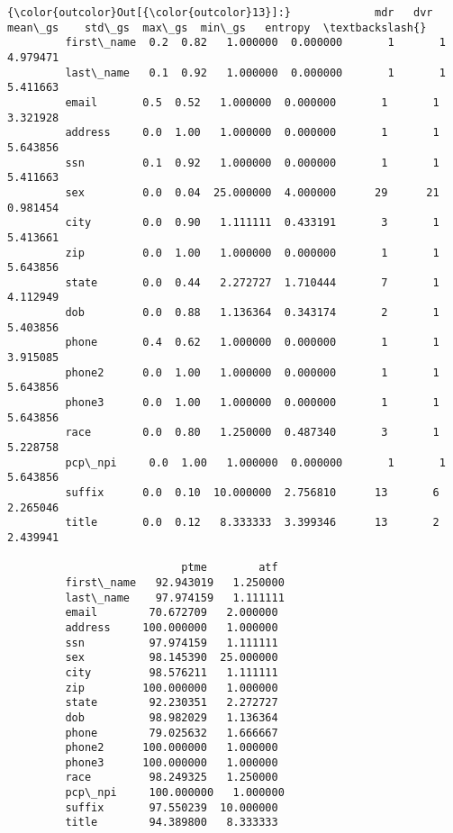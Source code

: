 \documentclass[11pt]{article}
\begin{document}
\begin{Verbatim}[commandchars=\\\{\}]
{\color{outcolor}Out[{\color{outcolor}13}]:}             mdr   dvr    mean\_gs    std\_gs  max\_gs  min\_gs   entropy  \textbackslash{}
         first\_name  0.2  0.82   1.000000  0.000000       1       1  4.979471   
         last\_name   0.1  0.92   1.000000  0.000000       1       1  5.411663   
         email       0.5  0.52   1.000000  0.000000       1       1  3.321928   
         address     0.0  1.00   1.000000  0.000000       1       1  5.643856   
         ssn         0.1  0.92   1.000000  0.000000       1       1  5.411663   
         sex         0.0  0.04  25.000000  4.000000      29      21  0.981454   
         city        0.0  0.90   1.111111  0.433191       3       1  5.413661   
         zip         0.0  1.00   1.000000  0.000000       1       1  5.643856   
         state       0.0  0.44   2.272727  1.710444       7       1  4.112949   
         dob         0.0  0.88   1.136364  0.343174       2       1  5.403856   
         phone       0.4  0.62   1.000000  0.000000       1       1  3.915085   
         phone2      0.0  1.00   1.000000  0.000000       1       1  5.643856   
         phone3      0.0  1.00   1.000000  0.000000       1       1  5.643856   
         race        0.0  0.80   1.250000  0.487340       3       1  5.228758   
         pcp\_npi     0.0  1.00   1.000000  0.000000       1       1  5.643856   
         suffix      0.0  0.10  10.000000  2.756810      13       6  2.265046   
         title       0.0  0.12   8.333333  3.399346      13       2  2.439941   
         
                           ptme        atf  
         first\_name   92.943019   1.250000  
         last\_name    97.974159   1.111111  
         email        70.672709   2.000000  
         address     100.000000   1.000000  
         ssn          97.974159   1.111111  
         sex          98.145390  25.000000  
         city         98.576211   1.111111  
         zip         100.000000   1.000000  
         state        92.230351   2.272727  
         dob          98.982029   1.136364  
         phone        79.025632   1.666667  
         phone2      100.000000   1.000000  
         phone3      100.000000   1.000000  
         race         98.249325   1.250000  
         pcp\_npi     100.000000   1.000000  
         suffix       97.550239  10.000000  
         title        94.389800   8.333333  
\end{Verbatim}
            
\end{document}
